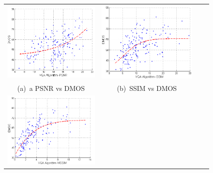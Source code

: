 \documentclass{article}
\begin{document}
\begin{figure}[h]
    \centering
    \begin{tabular}[h]{cc p{20em} p{20em}}
        \includegraphics[scale=.45]{psnr} &
        \includegraphics[scale=.45]{ssim} \\
        (a)~a PSNR vs DMOS &
        (b)~SSIM vs DMOS \\
       \includegraphics[scale=.45]{msssim} &

\end{tabular}
\end{figure}
\end{document}
